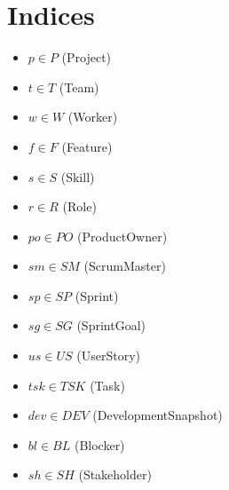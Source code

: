 \documentclass{article}
\begin{document}
\section{Indices}
\begin{itemize}
    \item $p \in P$ (Project)
    \item $t \in T$ (Team)
    \item $w \in W$ (Worker)
    \item $f \in F$ (Feature)
    \item $s \in S$ (Skill)
    \item $r \in R$ (Role)
    \item $po \in PO$ (ProductOwner)
    \item $sm \in SM$ (ScrumMaster)
    \item $sp \in SP$ (Sprint)
    \item $sg \in SG$ (SprintGoal)
    \item $us \in US$ (UserStory)
    \item $tsk \in TSK$ (Task)
    \item $dev \in DEV$ (DevelopmentSnapshot)
    \item $bl \in BL$ (Blocker)
    \item $sh \in SH$ (Stakeholder)
\end{itemize}
\end{document}
